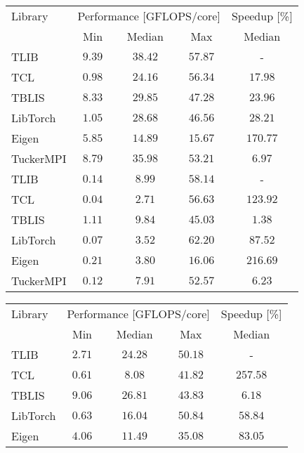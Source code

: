 \begin{table*}[t]
	\centering
	\footnotesize
	\begin{tabular}{lccc c}
		\toprule
		Library    & \multicolumn{3}{c}{Performance [GFLOPS/core]} & Speedup [\%] \\ 
		\cmidrule(lr){2-4} \cmidrule(lr){5-5}
		& Min   & Median  & Max & Median \\ 
		\midrule
		TLIB       & $\mathbf{9.39}$  & $\mathbf{38.42}$   & $\mathbf{57.87}$ &  - \\
		TCL        & $0.98$  & $24.16$   & $56.34$ & $17.98$     \\
		TBLIS      & $8.33$  & $29.85$   & $47.28$ & $23.96$     \\
		LibTorch   & $1.05$  & $28.68$   & $46.56$ & $28.21$     \\
		Eigen      & $5.85$  & $14.89$   & $15.67$ & $170.77$     \\
		TuckerMPI  & $8.79$  & $35.98$   & $53.21$ & $6.97$ \\
		\midrule
		TLIB       & $0.14$  & $8.99$    & $58.14$ &  - \\
		TCL        & $0.04$  & $2.71$    & $56.63$ & $123.92$     \\
		TBLIS      & $\mathbf{1.11}$  & $\mathbf{9.84}$  & $45.03$ & $1.38$     \\
		LibTorch   & $0.07$  & $3.52$    & $\mathbf{62.20}$ & $87.52$     \\
		Eigen      & $0.21$  & $3.80$    & $16.06$ & $216.69$     \\
		TuckerMPI  & $0.12$  & $7.91$    & $52.57$ & $6.23$ \\
		\bottomrule
	\end{tabular}
	\hspace{5em}
	\begin{tabular}{lccc c}
		\toprule
		Library    & \multicolumn{3}{c}{Performance [GFLOPS/core]} & Speedup [\%] \\ 
		\cmidrule(lr){2-4} \cmidrule(lr){5-5}
		& Min   & Median  & Max  & Median \\ 
		\midrule
		TLIB       & $2.71$  & $24.28$   & $\mathbf{50.18}$ &   -   \\
		TCL        & $0.61$  & $8.08$    & $41.82$ & $257.58$     \\
		TBLIS      & $\mathbf{9.06}$  & $\mathbf{26.81}$    & $43.83$ & $6.18$     \\
		LibTorch   & $0.63$  & $16.04$   & $50.84$ & $58.84$     \\
		Eigen      & $4.06$  & $11.49$   & $35.08$ & $83.05$     \\

\end{tabular}
\end{table*}
